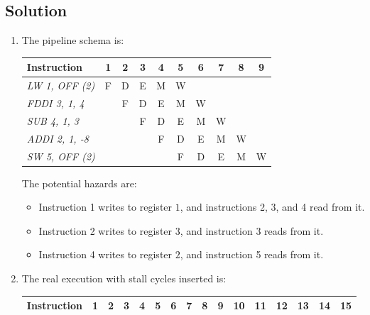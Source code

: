 \subsection*{Solution}
\begin{enumerate}
    \item The pipeline schema is:
        \begin{table}[H]
            \centering
            \begin{tabular}{l|ccccccccc}
            \textbf{Instruction}        & \textbf{1} & \textbf{2} & \textbf{3} & \textbf{4} & \textbf{5} & \textbf{6} & \textbf{7} & \textbf{8} & \textbf{9}  \\ \hline
            \textit{LW 1, OFF (2)}  & F          & D          & E          & M          & W          &            &            &            &            \\
            \textit{FDDI 3, 1, 4}   &            & F          & D          & E          & M          & W          &            &            &            \\
            \textit{SUB 4, 1, 3}  &            &            & F          & D          & E          & M          & W          &            &            \\
            \textit{ADDI 2, 1, -8}  &            &            &            & F          & D          & E          & M          & W          &            \\
            \textit{SW 5, OFF (2)}  &            &            &            &            & F          & D          & E          & M          & W         
            \end{tabular}
        \end{table}
        The potential hazards are:
        \begin{itemize}
            \item Instruction 1 writes to register $1$, and instructions 2, 3, and 4 read from it.
            \item Instruction 2 writes to register $3$, and instruction 3 reads from it.
            \item Instruction 4 writes to register $2$, and instruction 5 reads from it.
        \end{itemize}
    \item The real execution with stall cycles inserted is:
        \begin{table}[H]
            \centering
            \begin{tabular}{l|ccccccccccccccc}
            \textbf{Instruction}        & \textbf{1} & \textbf{2} & \textbf{3} & \textbf{4} & \textbf{5} & \textbf{6} & \textbf{7} & \textbf{8} & \textbf{9} & \textbf{10} & \textbf{11} & \textbf{12} & \textbf{13} & \textbf{14} & \textbf{15} \\ \hline

\end{tabular}
\end{table}
\end{enumerate}

